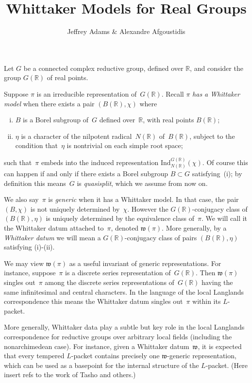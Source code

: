 \documentclass[10pt,leqno]{article}
\newcommand{\R}{\mathbb R}
\begin{document}
\title{Whittaker Models for Real Groups}
\author{Jeffrey Adams \& Alexandre Afgoustidis}
\maketitle

Let $G$ be a connected complex reductive group, defined over $\R$, and consider the group $G(\R)$ of real points. 

Suppose $\pi$ is an irreducible representation of~$G(\R)$. Recall $\pi$ \emph{has a Whittaker model} when there exists a pair $(B(\R), \chi)$ where 
\begin{enumerate}[(i)]
\item $B$ is a Borel subgroup of~$G$ defined over~$\R$, with real points $B(\R)$;
\item $\eta$ is a character of the nilpotent radical~$N(\R)$ of~$B(\R)$, subject to the condition that~$\eta$ is nontrivial on each simple root space;
\end{enumerate}
such that~$\pi$ embeds into the induced representation $\mathrm{Ind}_{N(\R)}^{G(\R)}(\chi)$. Of course this can happen if and only if there exists a Borel subgroup $B \subset G$ satisfying~(i); by definition this means~$G$ is \emph{quasisplit}, which we assume from now on. 

We also say~$\pi$ is \emph{generic} when it has a Whittaker model. In that case, the pair $(B, \chi)$ is not uniquely determined by~$\chi$. However the $G(\R)$-conjugacy class of $(B(\R), \eta)$ is uniquely determined by the equivalence class of~$\pi$. We will call it the Whittaker datum attached to~$\pi$, denoted $\mathfrak{w}(\pi)$. More generally, by a  {\it Whittaker datum} we will mean a $G(\R)$-conjugacy class of pairs  $(B(\R),\eta)$ satisfying (i)-(ii). 

We may view $\mathfrak{w}(\pi)$ as a useful invariant of generic representations. For instance, suppose~$\pi$ is a discrete series representation of~$G(\R)$. Then $\mathfrak{w}(\pi)$ singles out~$\pi$ among the discrete series representations of~$G(\R)$ having  the same infinitesimal and central characters. In the language of the local Langlands correspondence this means the Whittaker datum singles out~$\pi$ within its $L$-packet. 

More generally, Whittaker data play a subtle but key role in the local Langlands correspondence for reductive groups over arbitrary local fields (including the nonarchimedean case). For instance, given a Whittaker datum~$\mathfrak{w}$, it is expected that every tempered $L$-packet contains precisely one $\mathfrak{w}$-generic representation, which can be used as a basepoint for the internal structure of the $L$-packet. (Here insert refs to the work of Tasho and others.)
\end{document}
